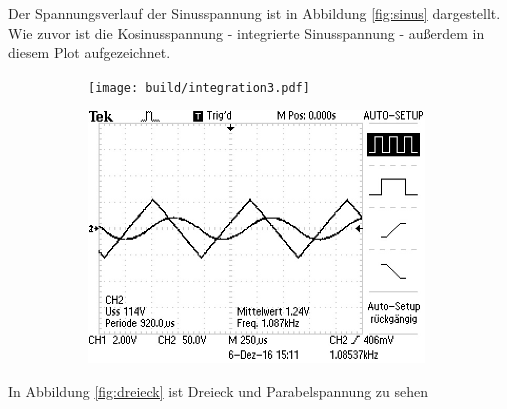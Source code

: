 Der Spannungsverlauf der Sinusspannung ist in Abbildung \ref{fig:sinus} dargestellt. Wie zuvor ist die Kosinusspannung - integrierte Sinusspannung - außerdem in diesem Plot aufgezeichnet.

\begin{figure}
	\caption{Aufgabenteil d: Dreiecksspannung}
	\label{fig:dreieck}
	\centering
	\begin{subfigure}{0.48\textwidth}
		\centering
		\texttt{[image: build/integration3.pdf]}
		\label{fig:intdreieck}
	\end{subfigure}
	\begin{subfigure}{0.48\textwidth}
		\centering
		\includegraphics[width=0.98\textwidth]{bilder/ALL0003/F0003TEK.JPG}
	\end{subfigure}

\end{figure}

In Abbildung \ref{fig:dreieck} ist Dreieck und Parabelspannung zu sehen
